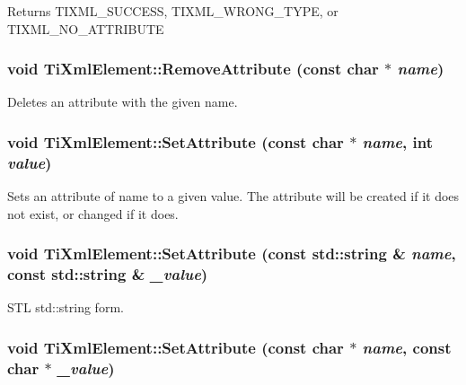 \begin{DoxyReturn}{Returns}
TIXML\_\-SUCCESS, TIXML\_\-WRONG\_\-TYPE, or TIXML\_\-NO\_\-ATTRIBUTE 
\end{DoxyReturn}
\hypertarget{class_ti_xml_element_a56979767deca794376b1dfa69a525b2a}{
\subsubsection[{RemoveAttribute}]{\setlength{\rightskip}{0pt plus 5cm}void TiXmlElement::RemoveAttribute (const char $\ast$ {\em name})}}
\label{class_ti_xml_element_a56979767deca794376b1dfa69a525b2a}
Deletes an attribute with the given name. \hypertarget{class_ti_xml_element_ace6f4be75e373726d4774073d666d1a7}{
\subsubsection[{SetAttribute}]{\setlength{\rightskip}{0pt plus 5cm}void TiXmlElement::SetAttribute (const char $\ast$ {\em name}, \/  int {\em value})}}
\label{class_ti_xml_element_ace6f4be75e373726d4774073d666d1a7}
Sets an attribute of name to a given value. The attribute will be created if it does not exist, or changed if it does. \hypertarget{class_ti_xml_element_a80ed65b1d194c71c6c9986ae42337d7d}{
\subsubsection[{SetAttribute}]{\setlength{\rightskip}{0pt plus 5cm}void TiXmlElement::SetAttribute (const std::string \& {\em name}, \/  const std::string \& {\em \_\-value})}}
\label{class_ti_xml_element_a80ed65b1d194c71c6c9986ae42337d7d}
STL std::string form. \hypertarget{class_ti_xml_element_abf0b3bd7f0e4c746a89ec6e7f101fc32}{
\subsubsection[{SetAttribute}]{\setlength{\rightskip}{0pt plus 5cm}void TiXmlElement::SetAttribute (const char $\ast$ {\em name}, \/  const char $\ast$ {\em \_\-value})}}
